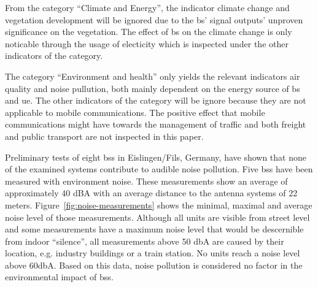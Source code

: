 \documentclass[11pt,a4paper]{article}
\begin{document}
From the category \enquote{Climate and Energy}, the indicator climate change and vegetation development will be ignored due to the \acrshort{bs}' signal outputs' unproven significance on the vegetation.
The effect of \acrshort{bs} on the climate change is only noticable through the usage of electicity which is inspected under the other indicators of the category.

The category \enquote{Environment and health} only yields the relevant indicators air quality and noise pullution, both mainly dependent on the energy source of \acrshort{bs} and \acrshort{ue}.
The other indicators of the category will be ignore because they are not applicable to mobile communications.
The positive effect that mobile communications might have towards the management of traffic and both freight and public transport are not inspected in this paper.

Preliminary tests of eight \acrlong{bs}s in Eislingen/Fils, Germany, have shown that none of the examined systems contribute to audible noise pollution.
Five \acrshort{bs}s have been measured with environment noise.
These measurements show an average of approximately 40 dBA with an average distance to the antenna systems of 22 meters.
Figure~\ref{fig:noise-measurements} shows the minimal, maximal and average noise level of those measurements.
Although all units are visible from street level and some measurements have a maximum noise level that would be descernible from indoor \enquote{silence}, all measurements above 50 dbA are caused by their location, e.g. industry buildings or a train station.
No units reach a noise level above 60dbA.
Based on this data, noise pollution is considered no factor in the environmental impact of \acrlong{bs}s.

\noiseData
\end{document}
